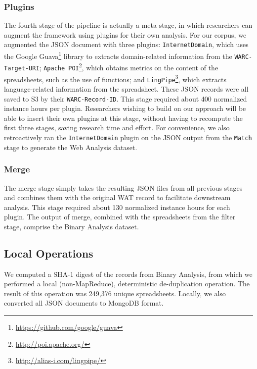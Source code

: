 \documentclass[conference]{IEEEtran}
\begin{document}
\subsubsection{Plugins} 

The fourth stage of the pipeline is actually a meta-stage, in which researchers can augment the framework using plugins for their own analysis. For our corpus, we augmented the JSON document with three plugins: \texttt{InternetDomain}, which uses the Google Guava\footnote{\url{https://github.com/google/guava}} library to extracts domain-related information from the \texttt{WARC-Target-URI}; \texttt{Apache POI}\footnote{\url{http://poi.apache.org/}}, which obtains metrics on the content of the spreadsheets, such as the use of functions; and \texttt{LingPipe}\footnote{\url{http://alias-i.com/lingpipe/}}, which extracts language-related information from the spreadsheet. These JSON records were all saved to S3 by their \texttt{WARC-Record-ID}. This stage required about 400 normalized instance hours per plugin. Researchers wishing to build on our approach will be able to insert their own plugins at this stage, without having to recompute the first three stages, saving research time and effort. For convenience, we also retroactively ran the \texttt{InternetDomain} plugin on the JSON output from the \texttt{Match} stage to generate the Web Analysis dataset.

\subsubsection{Merge} 

The merge stage simply takes the resulting JSON files from all previous stages and combines them with the original WAT record to facilitate downstream analysis. This stage required about 130 normalized instance hours for each plugin. The output of merge, combined with the spreadsheets from the filter stage, comprise the Binary Analysis dataset.

\subsection{Local Operations}


We computed a SHA-1 digest of the records from Binary Analysis, from which we performed a local (non-MapReduce), deterministic de-duplication operation. The result of this operation was 249,376 unique spreadsheets. Locally, we also converted all JSON documents to MongoDB format.
\end{document}
